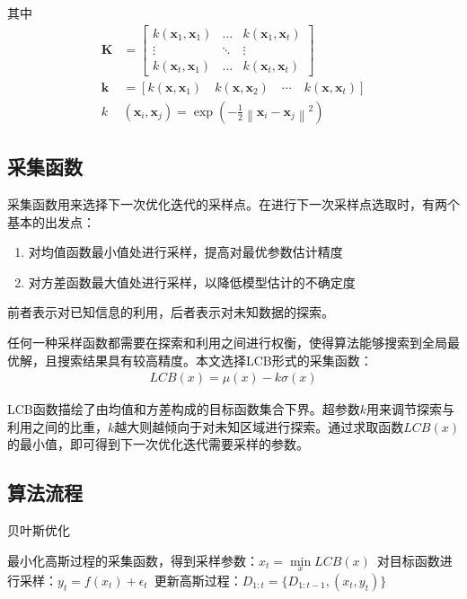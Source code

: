 其中
\begin{align}
\mathbf{K} & =\left[ \begin{array}{ccc}{k\left(\mathbf{x}_{1}, \mathbf{x}_{1}\right)} & {\dots} & {k\left(\mathbf{x}_{1}, \mathbf{x}_{t}\right)} \\ {\vdots} & {\ddots} & {\vdots} \\ {k\left(\mathbf{x}_{t}, \mathbf{x}_{1}\right)} & {\dots} & {k\left(\mathbf{x}_{t}, \mathbf{x}_{t}\right)}\end{array}\right] \\
\mathbf{k}&=\left[k\left(\mathbf{x}, \mathbf{x}_{1}\right) \quad k\left(\mathbf{x}, \mathbf{x}_{2}\right) \quad \cdots \quad k\left(\mathbf{x}, \mathbf{x}_{t}\right)\right] \\
k &\left(\mathbf{x}_{i}, \mathbf{x}_{j}\right)=\exp \left(-\frac{1}{2}\left\|\mathbf{x}_{i}-\mathbf{x}_{j}\right\|^{2}\right)
\end{align}

\subsection{采集函数}

采集函数用来选择下一次优化迭代的采样点。在进行下一次采样点选取时，有两个基本的出发点：
\begin{enumerate}
    \item 对均值函数最小值处进行采样，提高对最优参数估计精度
    \item 对方差函数最大值处进行采样，以降低模型估计的不确定度
\end{enumerate}

前者表示对已知信息的利用，后者表示对未知数据的探索。

任何一种采样函数都需要在探索和利用之间进行权衡，使得算法能够搜索到全局最优解，且搜索结果具有较高精度。本文选择LCB形式的采集函数：
\begin{align}
    LCB(x) = \mu(x) - k\sigma(x)
\end{align}

LCB函数描绘了由均值和方差构成的目标函数集合下界。超参数$k$用来调节探索与利用之间的比重，$k$越大则越倾向于对未知区域进行探索。通过求取函数$LCB(x)$的最小值，即可得到下一次优化迭代需要采样的参数。

\subsection{算法流程}

\begin{algorithm}[h]
    \caption{贝叶斯优化}
    \begin{algorithmic}[1]
    \STATE 最小化高斯过程的采集函数，得到采样参数：$x_t=\mathop{min}\limits_{x}LCB(x)$\
    \STATE 对目标函数进行采样：$y_t = f(x_t)+\epsilon_t$\
    \STATE 更新高斯过程：$D_{1:t} = \{ D_{1:t-1},(x_t,y_t)\}$
    \ENDFOR
    \end{algorithmic}
\end{algorithm}

